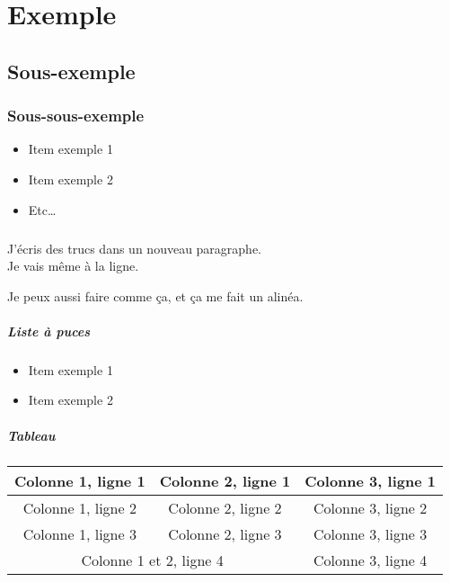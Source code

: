 \chapter{Exemple}
    \section{Sous-exemple}

\lipsum[1-2]

    \subsection{Sous-sous-exemple}

\begin{itemize}
    \item Item exemple 1
    \item Item exemple 2
    \item Etc\ldots
\end{itemize}

\paragraph{}
J'écris des trucs dans un nouveau paragraphe.\\
Je vais même à la ligne.

Je peux aussi faire comme ça, et ça me fait un alinéa.

\paragraph{Liste à puces}
\begin{itemize}[label=\textbullet]
    \item Item exemple 1
    \item Item exemple 2
\end{itemize}

\paragraph{Tableau}
\begin{center}
\begin{tabular}{|c|c|c|}
    \hline %
    Colonne 1, ligne 1 & Colonne 2, ligne 1 & Colonne 3, ligne 1\\
    \hline
    Colonne 1, ligne 2 & Colonne 2, ligne 2 & Colonne 3, ligne 2\\
    Colonne 1, ligne 3 & Colonne 2, ligne 3 & Colonne 3, ligne 3\\
    \hline
    \multicolumn{2}{|c|}{Colonne 1 et 2, ligne 4} & Colonne 3, ligne 4\\
    \hline
\end{tabular}
\end{center}
